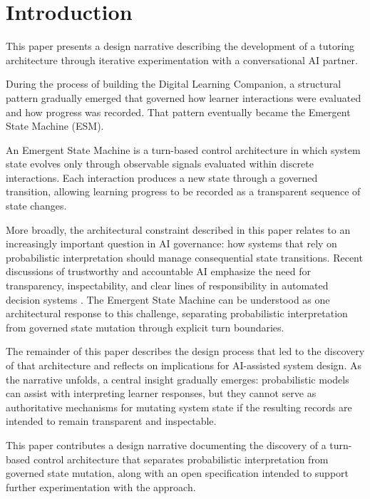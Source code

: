\documentclass[11pt]{article}
\begin{document}
\vspace{1.5em}



\section{Introduction}

This paper presents a design narrative describing the development of a tutoring architecture through iterative experimentation with a conversational AI partner.

During the process of building the Digital Learning Companion, a structural pattern gradually emerged that governed how learner interactions were evaluated and how progress was recorded. That pattern eventually became the Emergent State Machine (ESM).

An Emergent State Machine is a turn-based control architecture in which system state evolves only through observable signals evaluated within discrete interactions. Each interaction produces a new state through a governed transition, allowing learning progress to be recorded as a transparent sequence of state changes.

More broadly, the architectural constraint described in this paper relates to an increasingly important question in AI governance: how systems that rely on probabilistic interpretation should manage consequential state transitions. Recent discussions of trustworthy and accountable AI emphasize the need for transparency, inspectability, and clear lines of responsibility in automated decision systems \citep{floridi2018,nist2023}. The Emergent State Machine can be understood as one architectural response to this challenge, separating probabilistic interpretation from governed state mutation through explicit turn boundaries.

The remainder of this paper describes the design process that led to the discovery of that architecture and reflects on implications for AI-assisted system design. As the narrative unfolds, a central insight gradually emerges: probabilistic models can assist with interpreting learner responses, but they cannot serve as authoritative mechanisms for mutating system state if the resulting records are intended to remain transparent and inspectable.

This paper contributes a design narrative documenting the discovery of a turn-based control architecture that separates probabilistic interpretation from governed state mutation, along with an open specification intended to support further experimentation with the approach.
\end{document}
